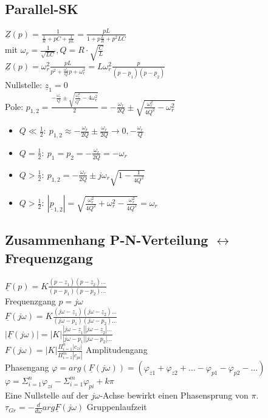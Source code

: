 \subsection{Parallel-SK}
$\underline{Z}(p)=\frac{1}{\frac{1}{R}+pC+\frac{1}{pL}}=\frac{pL}{1+p\frac{L}{R}+p^2LC}$\\
mit $\omega_r=\frac{1}{\sqrt{LC}}, Q=R\cdot\sqrt{\frac{C}{L}}$\\
$\underline{Z}(p)=\omega_r^2\frac{pL}{p^2+\frac{\omega_r}{Q}p+\omega_r^2}=L\omega_r^2
\frac{p}{(p-\underline{p}_1)(p-\underline{p}_2)}$\\
Nullstelle: $\underline{z}_1=0$\\
Pole:
$p_{1,2}=\frac{-\frac{\omega_r}{Q}\pm\sqrt{\frac{\omega_r^2}{Q^2}-4\omega_r^2}}{2}=-\frac{\omega_r}{2Q}\pm\sqrt{\frac{\omega_r^2}{4Q^2}-\omega_r^2}$\\
\begin{itemize}
  \item $Q\ll\frac{1}{2}:\
  p_{1,2}\approx-\frac{\omega_r}{2Q}\pm\frac{\omega_r}{2Q}\rightarrow 0,
  -\frac{\omega_r}{Q}$
  \item $Q=\frac{1}{2}:\ p_1=p_2=-\frac{\omega_r}{2Q}=-\omega_r$
  \item $Q>\frac{1}{2}:\ p_{1,2}=-\frac{\omega_r}{2Q}\pm
  j\omega_r\sqrt{1-\frac{1}{4Q^2}}$
  \item $Q>\frac{1}{2}:\ 
  |\underline{p}_{1,2}|=\sqrt{\frac{\omega_r^2}{4Q^2}+\omega_r^2-\frac{\omega_r^2}{4Q^2}}=\omega_r$
\end{itemize}

\subsection{Zusammenhang P-N-Verteilung $\leftrightarrow$ Frequenzgang}
$\underline{F}(p)=K\frac{(p-\underline{z}_1)(p-\underline{z}_2)\ldots}{(p-p_1)(p-p_2)\ldots}$\\
Frequenzgang $p=j\omega$\\
$\underline{F}(j\omega)=K\frac{(j\omega-\underline{z}_1)(j\omega-\underline{z}_2)\ldots}{(j\omega-p_1)(j\omega-p_2)\ldots}$\\
$|\underline{F}(j\omega)|=|K|\frac{|j\omega-\underline{z}_1||j\omega-\underline{z}_2|\ldots}{|j\omega-p_1||j\omega-p_2|\ldots}$\\
$F(j\omega)=|K|\frac{\Pi_{i=1}^{n}|c_{zi}|}{\Pi_{i=1}^{m}|c_{pi}|}$
Amplitudengang\\
Phasengang $\varphi =
arg\left(\underline{F}(j\omega)\right)=\left(\varphi_{z1}+\varphi_{z2}+\ldots-\varphi_{p1}-\varphi_{p2}-\ldots\right)$\\
$\varphi = \Sigma_{i=1}^n\varphi_{zi}-\Sigma_{i=1}^m\varphi_{pi}+k\pi$\\
Eine Nullstelle auf der $j\omega$-Achse bewirkt einen Phasensprung von $\pi$.\\
$\tau_{Gr}=-\frac{d}{d\omega}arg\underline{F}(j\omega)$ Gruppenlaufzeit\\
